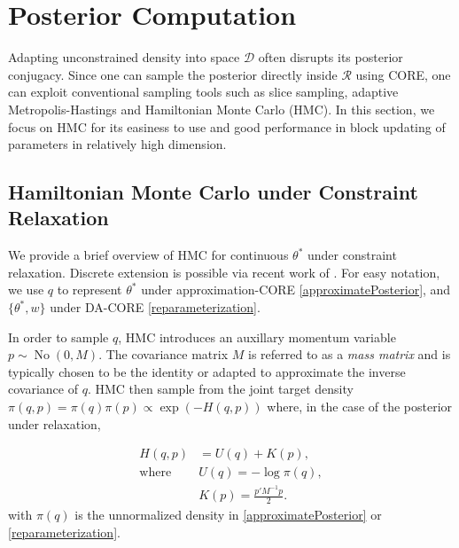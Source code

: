 \documentclass[10pt,fleqn]{article}
\newcommand{\mc}[1]{\mathcal{#1}}
\DeclareMathOperator{\No}{No}
\DeclareMathOperator{\1}{\mathbbm{1}}
\newcommand{\mass}{M} %
\begin{document}
\section{Posterior Computation}

Adapting  unconstrained density into space $\mc D$ often disrupts its posterior conjugacy. Since one can sample the posterior directly inside $\mc R$ using
 CORE, one can exploit conventional sampling tools such as slice sampling, adaptive Metropolis-Hastings and Hamiltonian Monte Carlo (HMC). In this section, we focus on HMC for its easiness to use and good performance in block updating of parameters in relatively high dimension.

\subsection{Hamiltonian Monte Carlo under Constraint Relaxation}

We provide a brief overview of HMC for continuous $\theta^*$ under constraint relaxation. Discrete extension is possible via recent work of \cite{nishimura2017discontinuous}. For easy notation, we use $q$ to represent $\theta^*$ under approximation-CORE \eqref{approximatePosterior}, and $\{\theta^*, w\}$ under DA-CORE \eqref{reparameterization}.

In order to sample $q$, HMC introduces an auxillary momentum variable $p \sim \No(0, \mass)$. The covariance matrix $\mass$ is referred to as a \textit{mass matrix} and is typically chosen to be the identity or adapted to approximate the inverse covariance of $q$. HMC then sample from the joint target density $\pi(q, p) = \pi(q) \pi(p) \propto \exp (- H(q, p))$ where, in the case of the posterior under relaxation, 


\begin{equation}
\begin{aligned}
H(q, p)& = U(q)+K(p),\\
\text{where } & U(q) = -\log\pi(q),\\
& K(p) = \frac{p'\mass^{-1} p}{2}.
\end{aligned}
\end{equation}
with $\pi(q)$ is the unnormalized density in \eqref{approximatePosterior} or \eqref{reparameterization}. %
\end{document}
